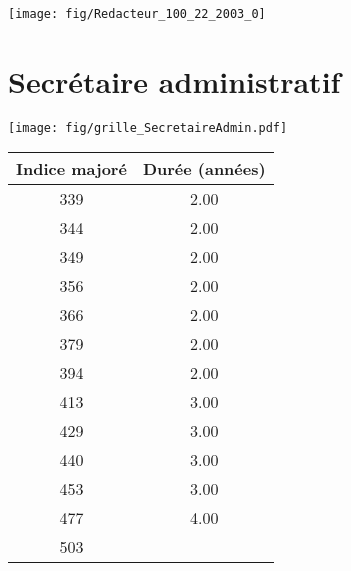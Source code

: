  \vspace{0.1cm} 

 {\hspace{-2.2cm}\texttt{[image: fig/Redacteur\_100\_22\_2003\_0]}} 

\newpage 
 
\chapter{Secrétaire administratif} 

\begin{minipage}{0.55\linewidth}\texttt{[image: fig/grille\_SecretaireAdmin.pdf]}\end{minipage} 
\begin{minipage}{0.3\linewidth} 
 \begin{center} 

\begin{tabular}[htb]{|c|c|} 
\hline 
 Indice majoré &  Durée (années) \\ 
\hline \hline 
 339 &  2.00 \\ 
\hline 
 344 &  2.00 \\ 
\hline 
 349 &  2.00 \\ 
\hline 
 356 &  2.00 \\ 
\hline 
 366 &  2.00 \\ 
\hline 
 379 &  2.00 \\ 
\hline 
 394 &  2.00 \\ 
\hline 
 413 &  3.00 \\ 
\hline 
 429 &  3.00 \\ 
\hline 
 440 &  3.00 \\ 
\hline 
 453 &  3.00 \\ 
\hline 
 477 &  4.00 \\ 
\hline 
 503 &   \\ 
\hline 
\hline 
\end{tabular} 
\end{center} 
 \end{minipage} 

~\\ 
 


   
 \localtableofcontents 

